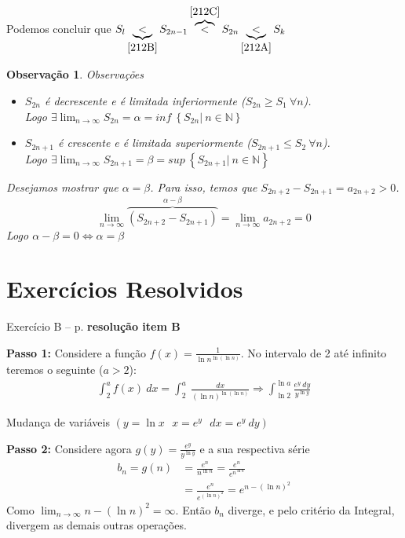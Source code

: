 \documentclass[12pt,openany, letterpaper]{book}
\newtheorem{obs}{Observação}
\newcommand{\LI}[1][n]{\lim_{{#1} \rightarrow \infty}}
\begin{document}
Podemos concluir que $S_l \underbrace{<}_{\ref{212B}} S_{2n-1} \overbrace{<}^{\ref{212C}} S_{2n} \underbrace{<}_{\ref{212A}} S_k$

\begin{obs}{Observações}
\begin{itemize}
\item $S_{2n}$ é decrescente e é limitada inferiormente ($S_{2n} \geq S_1 \ \forall n$). \\
Logo $\exists \displaystyle{\lim_{n \rightarrow \infty} S_{2n} = \alpha = inf \ \left\{S_{2n} | \ n \in \mathds{N}\right\} }$
\item $S_{2n+1}$ é crescente e é limitada superiormente ($S_{2n+1} \leq S_2 \ \forall n$). \\
Logo $\exists \displaystyle{\lim_{n \rightarrow \infty} S_{2n+1} = \beta = sup \ \left\{S_{2n+1} | \ n \in \mathds{N}\right\} }$
\end{itemize}

Desejamos mostrar que $\alpha = \beta$. Para isso, temos que $S_{2n+2} - S_{2n+1} = a_{2n+2} > 0$. 
$$\lim_{n \rightarrow \infty} \overbrace{\left(S_{2n+2} - S_{2n+1}\right)}^{\alpha - \beta} = \lim_{n \rightarrow \infty} a_{2n+2} = 0$$
Logo $\alpha - \beta = 0 \Longleftrightarrow \alpha = \beta$
\end{obs}

\section{Exercícios Resolvidos}
 
Exercício B -- p. \pageref{avaliar}
\textbf{resolução item B}

\textbf{Passo 1:} Considere a função $\displaystyle{f(x) = \frac{1}{\ln n^{\ln(\ln n)}}}$. No intervalo de 2 até infinito teremos o seguinte ($a > 2$): \begin{align*}
\int_2^a f(x) \ dx = \int_2^a \ \frac{dx}{(\ln n)^{\ln(\ln n)}}
\Rightarrow \int_{\ln 2}^{\ln a} \frac{e^y \ dy}{y^{\ln y}} \label{ob:2-11}
\end{align*}

 Mudança de variáveis $(y = \ln x  \ \ \ x = e^y \ \ \ dx = e^y \ dy)$

\vspace{5mm}

\textbf{Passo 2:} Considere agora $g(y) = \frac{e^y}{y^{\ln y}}$ e a sua respectiva série 
\begin{align*}
b_n = g(n) &= \frac{e^n}{n^{\ln n}} = \frac{e^n}{e^{n^{\ln n}}} \\
&= \frac{e^n}{e^{(\ln n)^2}} = e^{n - (\ln n)^2}
\end{align*}
Como $\displaystyle{\LI n - (\ln n)^2 = \infty}$. Então $b_n$ diverge, e pelo critério da Integral, divergem as demais outras operações.
\end{document}
